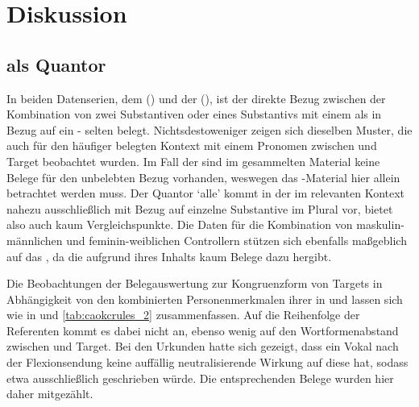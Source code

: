 \chapter{Diskussion}
\label{ch:diskussion}

\section{ als Quantor}
\label{sec:beidequant}

In beiden Datenserien, dem 
(\CAO{}) und der  (\KC{}), ist der direkte Bezug zwischen
der Kombination von zwei Substantiven oder eines Substantivs mit
einem  als  in Bezug auf ein
- selten belegt. Nichtsdestoweniger zeigen sich
dieselben Muster, die auch für den häufiger belegten Kontext mit einem Pronomen
zwischen  und Target beobachtet wurden. Im Fall der \KC{} sind
im gesammelten Material keine Belege für den unbelebten Bezug
vorhanden, weswegen das \CAO{}-Material hier allein betrachtet werden muss. Der
Quantor  `alle' \autocite[vgl.][606--621]{ksw2} kommt in der \KC{} im
relevanten Kontext nahezu ausschließlich mit Bezug auf einzelne Substan\-tive
im Plural vor, bietet also auch kaum Vergleichspunkte. Die Daten für die
Kombination von maskulin-männlichen und feminin-weiblichen
Controllern stützen sich ebenfalls maßgeblich auf das \CAO{}, da
die \KC{} aufgrund ihres Inhalts kaum Belege dazu hergibt.

Die Beobachtungen der Belegauswertung zur Kongruenzform von Targets
in Abhängigkeit von den kombinierten Personenmerkmalen
ihrer  in  und
 lassen sich wie in  und
\ref{tab:caokcrules_2} zusammenfassen. Auf die Reihenfolge der
Referenten kommt es dabei nicht an, ebenso wenig auf den
Wortformenabstand zwischen  und Target. Bei
den Urkunden hatte sich gezeigt, dass ein Vokal nach der
Flexionsendung  keine auffällig neutrali\-sie\-rende Wirkung auf
diese hat, sodass etwa ausschließlich  geschrieben würde. Die
entsprechenden Belege wurden hier daher mitgezählt.

